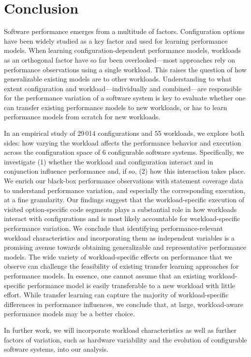 {\color{blue}
\section{Conclusion}
Software performance emerges from a multitude of factors. Configuration options have been widely studied as a key factor and used for learning performance models.  When learning configuration-dependent performance models, workloads as an orthogonal factor have so far been overlooked---most approaches rely on performance observations using a single workload. This raises the question of how generalizable existing models are to other workloads. 
Understanding to what extent configuration and workload---individually and combined---are responsible for the performance variation of a software system is key to evaluate whether one can transfer existing performance models to new workloads, or has to learn performance models from scratch for new workloads.

In an empirical study of 29\,014 configurations and 55 workloads, we explore both sides: how varying the workload affects the performance behavior and execution across the configuration space of 6 configurable software systems. Specifically, we investigate (1) whether the workload and configuration interact and in conjunction influence performance and, if so, (2) how this interaction takes place.
We enrich our black-box performance observations with statement coverage data to understand performance variation, and especially the corresponding execution, at a fine granularity.
Our findings suggest that the workload-specific execution of visited option-specific code segments plays a substantial role in how workloads interact with configurations and is most likely accountable for workload-specific performance variation. 
We conclude that identifying performance-relevant workload characteristics and incorporating them as independent variables is a promising avenue towards obtaining generalizable and representative performance models.
The wide variety of workload-specific effects on performance that we observe can challenge the feasibility of existing transfer learning approaches for performance models. In essence, one cannot assume that an existing  workload-specific performance model is easily transferable to a new workload with little effort. While transfer learning can capture the majority of workload-specific differences in performance influences, we conclude that, at large, workload-aware performance models may be a better choice.

In further work, we will incorporate workload characteristics as well as further factors of variation, such as hardware variability and the evolution of configurable software systems, into our analysis.

}
